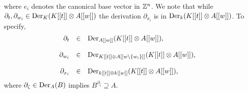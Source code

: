 where $e_i$ denotes the canonical base vector in $\zz^n$. We note that while $\partial_t, \partial_{w_i} \in \trm{Der}_K(K[[t]]\otimes A[[w]])$ the derivation $\partial_{x_i}$ is in $\trm{Der}_k(K[[t]] \otimes A[[w]])$. To specify,
$$\bao{rcl}
\partial_t &\in& \trm{Der}_{A[[w]]}(K[[t]] \otimes A[[w]]),\\
&&\\
 \partial_{w_i} &\in& \trm{Der}_{K[[t]] \otimes A[[w \bsl\{w_i\}]]}(K[[t]]\otimes A[[w]]),\\
&&\\
 \partial_{x_i} &\in& \trm{Der}_{k[[t]] \otimes k[[w]]} (K[[t]]\otimes A[[w]]),\\\ea$$
where $\partial_\zeta \in \trm{Der}_A(B)$ implies $B^{\partial_\zeta} \supseteq A$.
